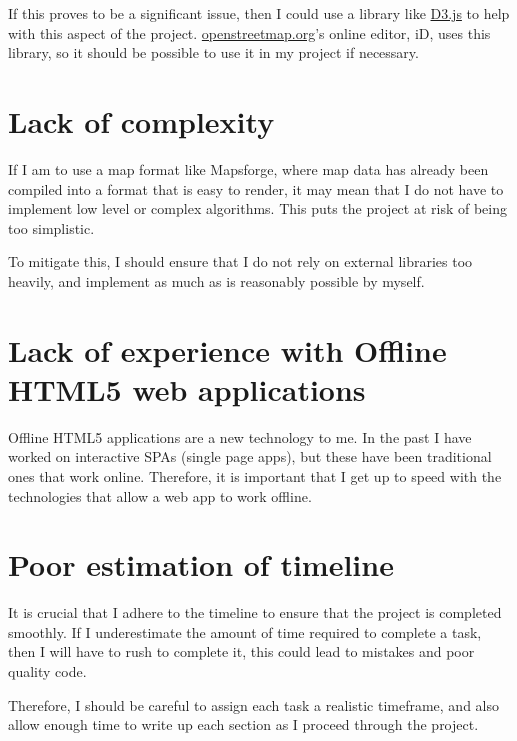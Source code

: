 \documentclass[]{final_report}
\begin{document}
If this proves to be a significant issue, then I could use a library like \href{https://github.com/d3/d3-geo}{D3.js} to help with this aspect of the project. \href{https://openstreetmap.org}{openstreetmap.org}'s online editor, iD, uses this library, so it should be possible to use it in my project if necessary.

\section{Lack of complexity}

If I am to use a map format like Mapsforge, where map data has already been compiled into a format that is easy to render, it may mean that I do not have to implement low level or complex algorithms. This puts the project at risk of being too simplistic.

To mitigate this, I should ensure that I do not rely on external libraries too heavily, and implement as much as is reasonably possible by myself.

\section{Lack of experience with Offline HTML5 web applications}

Offline HTML5 applications are a new technology to me. In the past I have worked on interactive SPAs (single page apps), but these have been traditional ones that work online. Therefore, it is important that I get up to speed with the technologies that allow a web app to work offline.

\section{Poor estimation of timeline}

It is crucial that I adhere to the timeline to ensure that the project is completed smoothly. If I underestimate the amount of time required to complete a task, then I will have to rush to complete it, this could lead to mistakes and poor quality code.

Therefore, I should be careful to assign each task a realistic timeframe, and also allow enough time to write up each section as I proceed through the project.


\end{document}
